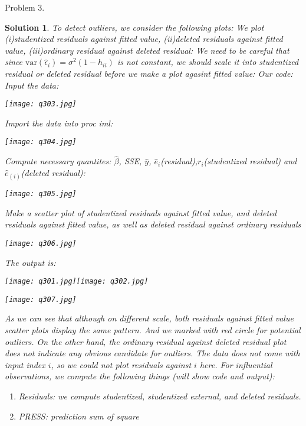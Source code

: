 \documentclass[11pt]{article}
\newtheorem{sol}{Solution}
\begin{document}
Problem $3.$
\begin{sol}
	To detect outliers, we consider the following plots:\vskip 2mm
	We plot (i)studentized residuals against fitted value, (ii)deleted residuals against fitted value, (iii)ordinary residual against deleted residual:\vskip 2mm
	We need to be careful that since $\text{var}(\hat{\epsilon}_i) = \sigma^2(1 - h_{ii})$ is not constant, we should scale it into studentized residual or deleted residual before we make a plot agasint fitted value:\vskip 2mm
	Our code:\vskip 2mm
	Input the data:
	\begin{center}
		\texttt{[image: q303.jpg]}
	\end{center}
	Import the data into proc iml:
	\begin{center}
		\texttt{[image: q304.jpg]}
	\end{center}
	Compute necessary quantites: $\hat{\beta}$, SSE, $\hat{y}$, $\hat{e}_i$(residual),$r_i$(studentized residual) and $\hat{e}_{(i)}$(deleted residual):
	\begin{center}
		\texttt{[image: q305.jpg]}
	\end{center} 
	Make a scatter plot of studentized residuals against fitted value, and deleted residuals against fitted value, as well as deleted residual against ordinary residuals\vskip 2mm
	\begin{center}
		\texttt{[image: q306.jpg]}
	\end{center}
	The output is:
	\begin{center}
		\texttt{[image: q301.jpg]}\texttt{[image: q302.jpg]}
	\end{center}
	\begin{center}
		\texttt{[image: q307.jpg]}
	\end{center}
	As we can see that although on different scale, both residuals against fitted value scatter plots display the same pattern. And we marked with red circle for potential outliers.\vskip 2mm
	On the other hand, the ordinary residual against deleted residual plot does not indicate any obvious candidate for outliers.\vskip 2mm
	The data does not come with input index $i$, so we could not plot residuals against $i$ here.\vskip 2mm
	For influential observations, we compute the following things (will show code and output):
	\begin{enumerate}
		\item Residuals: we compute studentized, studentized external, and deleted residuals.
		\item PRESS: prediction sum of square

\end{enumerate}
\end{sol}
\end{document}
